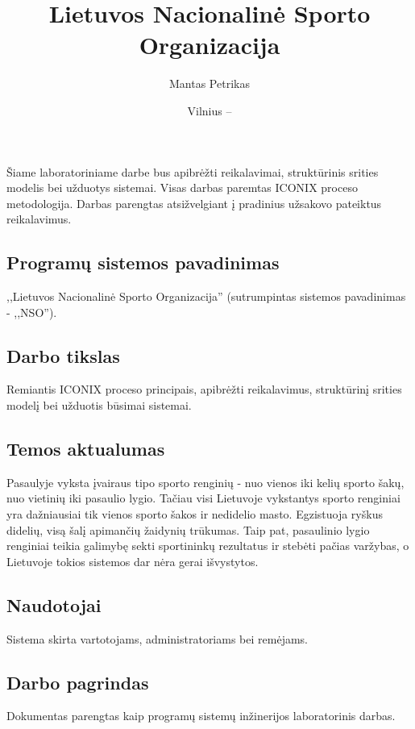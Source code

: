 \documentclass{VUMIFPSkursinis}
\title{Lietuvos Nacionalinė Sporto Organizacija}
\author{Mantas Petrikas}
\date{Vilnius – \the\year}
\begin{document}
    \maketitle
    \tableofcontents
    
     \label{anotacija}
		Šiame laboratoriniame darbe bus apibrėžti reikalavimai, struktūrinis srities modelis bei užduotys sistemai. Visas darbas paremtas ICONIX proceso metodologija.
		Darbas parengtas atsižvelgiant į pradinius užsakovo pateiktus reikalavimus.
		
     \label{ivadas}
        \subsection*{Programų sistemos pavadinimas} \label{ivadas_psPavadinimas}
            ,,Lietuvos Nacionalinė Sporto Organizacija'' (sutrumpintas sistemos pavadinimas - ,,NSO'').
        \subsection*{Darbo tikslas} \label{ivadas_darboTikslas}
            Remiantis ICONIX proceso principais, apibrėžti reikalavimus, struktūrinį srities modelį bei užduotis būsimai sistemai.
        \subsection*{Temos aktualumas} \label{ivadas_aktualumas}
            Pasaulyje vyksta įvairaus tipo sporto renginių - nuo vienos iki kelių sporto šakų, nuo vietinių iki pasaulio lygio. Tačiau visi Lietuvoje vykstantys sporto renginiai yra dažniausiai tik vienos sporto šakos ir nedidelio masto. Egzistuoja ryškus didelių, visą šalį apimančių žaidynių trūkumas. Taip pat, pasaulinio lygio renginiai teikia galimybę sekti sportininkų rezultatus ir stebėti pačias varžybas, o Lietuvoje tokios sistemos dar nėra gerai išvystytos.
        \subsection*{Naudotojai} \label{ivadas_naudotojai}
            Sistema skirta vartotojams, administratoriams bei remėjams.
        \subsection*{Darbo pagrindas} \label{ivadas_pagrindas}
            Dokumentas parengtas kaip programų sistemų inžinerijos laboratorinis darbas.
			
\end{document}
